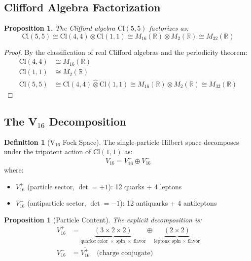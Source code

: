 \documentclass[12pt,a4paper]{article}
\newtheorem{proposition}[theorem]{Proposition}
\theoremstyle{definition}
\newtheorem{definition}[theorem]{Definition}
\theoremstyle{axiom}
\newcommand{\Cl}{\text{Cl}}
\begin{document}
\subsection{Clifford Algebra Factorization}

\begin{proposition}
The Clifford algebra $\Cl(5,5)$ factorizes as:
\begin{equation}
\Cl(5,5) \cong \Cl(4,4) \otimes \Cl(1,1) \cong M_{16}(\mathbb{R}) \otimes M_2(\mathbb{R}) \cong M_{32}(\mathbb{R})
\end{equation}
\end{proposition}

\begin{proof}
By the classification of real Clifford algebras and the periodicity theorem:
\begin{align*}
\Cl(4,4) &\cong M_{16}(\mathbb{R}) \\
\Cl(1,1) &\cong M_2(\mathbb{R}) \\
\Cl(5,5) &\cong \Cl(4,4) \hat{\otimes} \Cl(1,1) \cong M_{16}(\mathbb{R}) \otimes M_2(\mathbb{R}) \cong M_{32}(\mathbb{R})
\end{align*}
\end{proof}

\subsection{The V$_{16}$ Decomposition}

\begin{definition}[V$_{16}$ Fock Space]
The single-particle Hilbert space decomposes under the tripotent action of $\Cl(1,1)$ as:
\begin{equation}
V_{16} = V_{16}^+ \oplus V_{16}^-
\end{equation}
where:
\begin{itemize}
\item $V_{16}^+$ (particle sector, $\det = +1$): 12 quarks + 4 leptons
\item $V_{16}^-$ (antiparticle sector, $\det = -1$): 12 antiquarks + 4 antileptons
\end{itemize}
\end{definition}

\begin{proposition}[Particle Content]
The explicit decomposition is:
\begin{align*}
V_{16}^+ &= \underbrace{(3 \times 2 \times 2)}_{\text{quarks: color $\times$ spin $\times$ flavor}} \oplus \underbrace{(2 \times 2)}_{\text{leptons: spin $\times$ flavor}} \\
V_{16}^- &= \overline{V_{16}^+} \quad \text{(charge conjugate)}
\end{align*}
\end{proposition}
\end{document}
